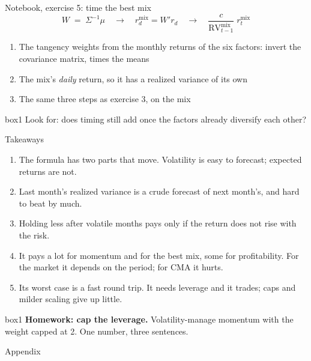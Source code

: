 \documentclass[aspectratio=169,10pt]{beamer}
\begin{document}
\begin{frame}{Notebook, exercise 5: time the best mix}
\[ W \;=\; \Sigma^{-1}\mu \quad\longrightarrow\quad r^{\text{mix}}_{d} = W' r_{d} \quad\longrightarrow\quad \frac{c}{\text{RV}^{\text{mix}}_{t-1}}\; r^{\text{mix}}_{t} \]
\vskip 4pt
\begin{enumerate}
\item The tangency weights from the monthly returns of the six factors: invert the covariance matrix, times the means
\vskip 4pt
\item The mix's \emph{daily} return, so it has a realized variance of its own
\vskip 4pt
\item The same three steps as exercise 3, on the mix
\end{enumerate}
\vskip 10pt
\begin{beamercolorbox}[rounded=true,sep=7pt,center]{box1}
Look for: does timing still add once the factors already diversify each other?
\end{beamercolorbox}
\end{frame}

\begin{frame}{Takeaways}
\begin{enumerate}
\item The formula has two parts that move. Volatility is easy to forecast; expected returns are not.
\vskip 4pt
\item Last month's realized variance is a crude forecast of next month's, and hard to beat by much.
\vskip 4pt
\item Holding less after volatile months pays only if the return does not rise with the risk.
\vskip 4pt
\item It pays a lot for momentum and for the best mix, some for profitability. For the market it depends on the period; for CMA it hurts.
\vskip 4pt
\item Its worst case is a fast round trip. It needs leverage and it trades; caps and milder scaling give up little.
\end{enumerate}
\vskip 10pt
\begin{beamercolorbox}[rounded=true,sep=7pt]{box1}
\textbf{Homework: cap the leverage.} Volatility-manage momentum with the weight capped at 2. One number, three sentences.
\end{beamercolorbox}
\end{frame}

\appendix
\begin{frame}
\begin{center}
{\Large Appendix}
\end{center}
\end{frame}
\end{document}
